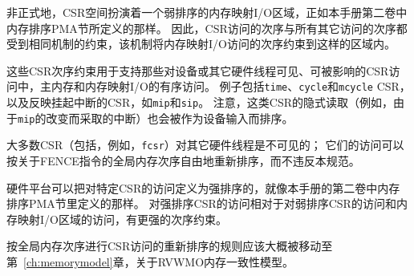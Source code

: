 \begin{commentary}
  非正式地，CSR空间扮演着一个弱排序的内存映射I/O区域，正如本手册第二卷中内存排序PMA节所定义的那样。
  因此，CSR访问的次序与所有其它访问的次序都受到相同机制的约束，该机制将内存映射I/O访问的次序约束到这样的区域内。

这些CSR次序约束用于支持那些对设备或其它硬件线程可见、可被影响的CSR访问中，主内存和内存映射I/O的有序访问。
例子包括{\tt time}、{\tt cycle}和{\tt mcycle} CSR，以及反映挂起中断的CSR，如{\tt mip}和{\tt sip}。
注意，这类CSR的隐式读取（例如，由于{\tt mip}的改变而采取的中断）也会被作为设备输入而排序。

大多数CSR（包括，例如，{\tt fcsr}）对其它硬件线程是不可见的；
它们的访问可以按关于FENCE指令的全局内存次序自由地重新排序，而不违反本规范。
\end{commentary}

硬件平台可以把对特定CSR的访问定义为强排序的，就像本手册的第二卷中内存排序PMA节里定义的那样。
对强排序CSR的访问相对于对弱排序CSR的访问和内存映射I/O区域的访问，有更强的次序约束。

\begin{commentary}
  按全局内存次序进行CSR访问的重新排序的规则应该大概被移动至第~\ref{ch:memorymodel}章，关于RVWMO内存一致性模型。
\end{commentary}
